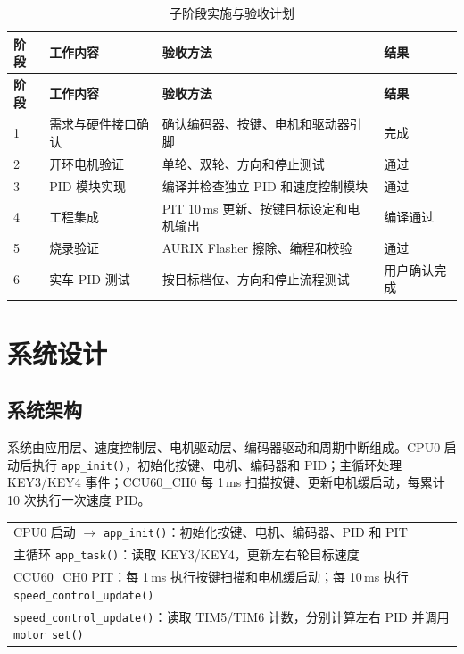 \documentclass[11pt,a4paper,fontset=fandol]{ctexart}
\begin{document}
\begin{longtable}{p{}p{}p{}p{}}
\caption{子阶段实施与验收计划}\\
\toprule
\textbf{阶段} & \textbf{工作内容} & \textbf{验收方法} & \textbf{结果}\\
\midrule
\endfirsthead
\toprule
\textbf{阶段} & \textbf{工作内容} & \textbf{验收方法} & \textbf{结果}\\
\midrule
\endhead
1 & 需求与硬件接口确认 & 确认编码器、按键、电机和驱动器引脚 & 完成\\
2 & 开环电机验证 & 单轮、双轮、方向和停止测试 & 通过\\
3 & PID 模块实现 & 编译并检查独立 PID 和速度控制模块 & 通过\\
4 & 工程集成 & PIT 10\,ms 更新、按键目标设定和电机输出 & 编译通过\\
5 & 烧录验证 & AURIX Flasher 擦除、编程和校验 & 通过\\
6 & 实车 PID 测试 & 按目标档位、方向和停止流程测试 & 用户确认完成\\
\bottomrule
\end{longtable}

\section{系统设计}

\subsection{系统架构}

系统由应用层、速度控制层、电机驱动层、编码器驱动和周期中断组成。CPU0 启动后执行 \texttt{app\_init()}，初始化按键、电机、编码器和 PID；主循环处理 KEY3/KEY4 事件；CCU60\_CH0 每 1\,ms 扫描按键、更新电机缓启动，每累计 10 次执行一次速度 PID。

\begin{center}
\begin{tabularx}{0.96\textwidth}{>{\centering\arraybackslash}X}
\toprule
CPU0 启动 $\rightarrow$ \texttt{app\_init()}：初始化按键、电机、编码器、PID 和 PIT\\
主循环 \texttt{app\_task()}：读取 KEY3/KEY4，更新左右轮目标速度\\
CCU60\_CH0 PIT：每 1\,ms 执行按键扫描和电机缓启动；每 10\,ms 执行 \texttt{speed\_control\_update()}\\
\texttt{speed\_control\_update()}：读取 TIM5/TIM6 计数，分别计算左右 PID 并调用 \texttt{motor\_set()}\\
\bottomrule
\end{tabularx}
\end{center}
\end{document}
